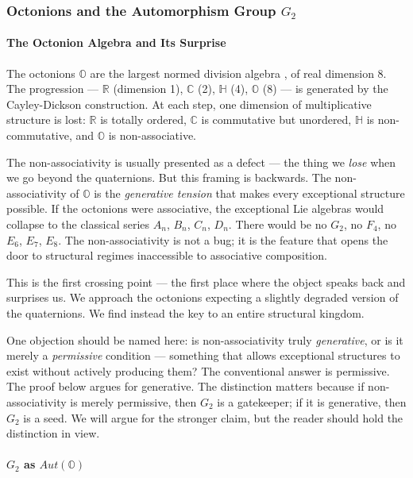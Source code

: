\documentclass[12pt,a4paper]{article}
\begin{document}
\subsubsection{Octonions and the Automorphism Group \texorpdfstring{$G_2$}{G_2}}

\paragraph{The Octonion Algebra and Its Surprise}

The octonions $\mathbb{O}$ are the largest normed division algebra \cite{baez2002}, of real dimension 8. The progression --- $\mathbb{R}$ (dimension 1), $\mathbb{C}$ (2), $\mathbb{H}$ (4), $\mathbb{O}$ (8) --- is generated by the Cayley-Dickson construction. At each step, one dimension of multiplicative structure is lost: $\mathbb{R}$ is totally ordered, $\mathbb{C}$ is commutative but unordered, $\mathbb{H}$ is non-commutative, and $\mathbb{O}$ is non-associative.

The non-associativity is usually presented as a defect --- the thing we \emph{lose} when we go beyond the quaternions. But this framing is backwards. The non-associativity of $\mathbb{O}$ is the \emph{generative tension} that makes every exceptional structure possible. If the octonions were associative, the exceptional Lie algebras would collapse to the classical series $A_n$, $B_n$, $C_n$, $D_n$. There would be no $G_2$, no $F_4$, no $E_6$, $E_7$, $E_8$. The non-associativity is not a bug; it is the feature that opens the door to structural regimes inaccessible to associative composition.

This is the first crossing point --- the first place where the object speaks back and surprises us. We approach the octonions expecting a slightly degraded version of the quaternions. We find instead the key to an entire structural kingdom.

One objection should be named here: is non-associativity truly \emph{generative}, or is it merely a \emph{permissive} condition --- something that allows exceptional structures to exist without actively producing them? The conventional answer is permissive. The proof below argues for generative. The distinction matters because if non-associativity is merely permissive, then $G_2$ is a gatekeeper; if it is generative, then $G_2$ is a seed. We will argue for the stronger claim, but the reader should hold the distinction in view.

\paragraph{$G_2$ as ${Aut}(\mathbb{O})$}
\end{document}
